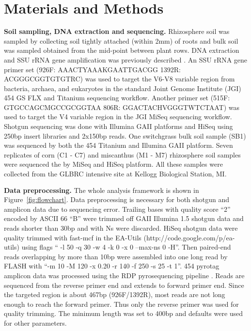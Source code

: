 \documentclass[12pt]{article}
\begin{document}
\section{Materials and Methods}

{\bf Soil sampling, DNA extraction and sequencing.} Rhizosphere soil
was sampled by collecting soil tightly attached (within 2mm) of roots
and bulk soil was sampled obtained from the mid-point between plant
rows. DNA extraction and SSU rRNA gene amplification was previously
described \cite{ed2010}. An SSU rRNA gene primer set (926F:
AAACTYAAAKGAATTGACGG 1392R: ACGGGCGGTGTGTRC) was used to target the
V6-V8 variable region from bacteria, archaea, and eukaryotes in the
standard Joint Genome Institute (JGI) 454 GS FLX and Titanium
sequencing workflow. Another primer set (515F: GTGCCAGCMGCCGCGGTAA
806R: GGACTACHVGGGTWTCTAAT) was used to target the V4 variable region
in the JGI MiSeq sequencing workflow. Shotgun sequencing was done with
Illumina GAII platforms and HiSeq using 250bp insert libraries and
2x150bp reads. One switchgrass bulk soil sample (SB1) was sequenced by
both the 454 Titanium and Illumina GAII platform. Seven replicates of
corn (C1 - C7) and miscanthus (M1 - M7) rhizosphere soil samples were
sequenced the by MiSeq and HiSeq platform.  All these samples were
collected from the GLBRC intensive site at Kellogg Biological Station,
MI.

{\bf Data preprocessing.} The whole analysis framework is shown in
Figure~\ref{fig:flowchart}. Data preprocessing is necessary for both
shotgun and amplicon data due to sequencing error. Trailing bases with
quality score ``2'' encoded by ASCII 66 ``B'' were trimmed off GAII
Illumina 1.5 shotgun data and reads shorter than 30bp and with Ns were
discarded. HiSeq shotgun data were quality trimmed with fast-mcf in
the EA-Utils (http://code.google.com/p/ea-utils) using flags `` -l 50
-q 30 -w 4 -k 0 -x 0 --max-ns 0 -H''. Then paired-end reads
overlapping by more than 10bp were assembled into one long read by
FLASH \cite{flash2011} with ``-m 10 -M 120 -x 0.20 -r 140 -f 250 -s 25
-t 1''. 454 pyrotag amplicon data was processed using the RDP
pyrosequencing pipeline \cite{rdp2009}. Reads are sequenced from the
reverse primer end and extends to forward primer end. Since the
targeted region is about 467bp (926F/1392R), most reads are not long
enough to reach the forward primer. Thus only the reverse primer was
used for quality trimming. The minimum length was set to 400bp and
defaults were used for other parameters.
\end{document}
